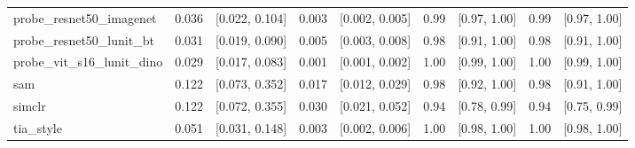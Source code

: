 \begin{tabular}{lrrrrrrrr}
probe\_resnet50\_imagenet & 0.036 & [0.022, 0.104] & 0.003 & [0.002, 0.005] & 0.99 & [0.97, 1.00] & 0.99 & [0.97, 1.00] \\
probe\_resnet50\_lunit\_bt & 0.031 & [0.019, 0.090] & 0.005 & [0.003, 0.008] & 0.98 & [0.91, 1.00] & 0.98 & [0.91, 1.00] \\
probe\_vit\_s16\_lunit\_dino & 0.029 & [0.017, 0.083] & 0.001 & [0.001, 0.002] & 1.00 & [0.99, 1.00] & 1.00 & [0.99, 1.00] \\
sam & 0.122 & [0.073, 0.352] & 0.017 & [0.012, 0.029] & 0.98 & [0.92, 1.00] & 0.98 & [0.91, 1.00] \\
simclr & 0.122 & [0.072, 0.355] & 0.030 & [0.021, 0.052] & 0.94 & [0.78, 0.99] & 0.94 & [0.75, 0.99] \\
tia\_style & 0.051 & [0.031, 0.148] & 0.003 & [0.002, 0.006] & 1.00 & [0.98, 1.00] & 1.00 & [0.98, 1.00] \\
\bottomrule
\end{tabular}
